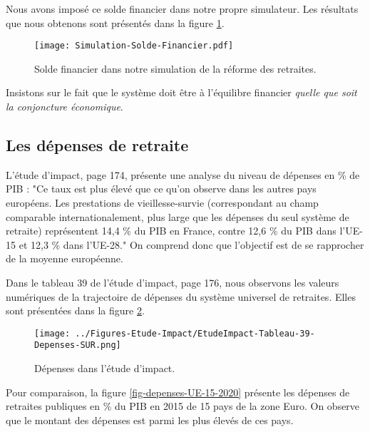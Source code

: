\documentclass[10pt]{article}
\begin{document}
Nous avons imposé ce solde financier dans notre propre simulateur. 
Les résultats que nous obtenons sont présentés dans la figure \ref{fig-solde-simulation}. 

\begin{figure}
\begin{center}
\texttt{[image: Simulation-Solde-Financier.pdf]}
\end{center}
\caption{Solde financier dans notre simulation de la réforme des retraites.}
\label{fig-solde-simulation}
\end{figure}

Insistons sur le fait que le système doit être à 
l'équilibre financier \emph{quelle que soit la 
conjoncture économique}. 


\subsection{Les dépenses de retraite}

L'étude d'impact, page 174, présente une analyse du niveau de dépenses 
en \% de PIB : "Ce taux est plus élevé que ce qu’on observe dans 
les autres pays européens. Les prestations de vieillesse-survie 
(correspondant au champ comparable internationalement, plus 
large que les dépenses du seul système de retraite) représentent 
14,4 \% du PIB en France, contre 12,6 \% du PIB dans l’UE-15 et 12,3 \% dans l’UE-28."
On comprend donc que l'objectif est de se rapprocher de la moyenne européenne. 

Dans le tableau 39 de l'étude d'impact, page 176, nous observons les valeurs numériques de la trajectoire de dépenses du système universel de retraites. 
Elles sont présentées dans la figure \ref{fig-depenses-etude-impact}.

\begin{figure}
\begin{center}
\texttt{[image: ../Figures-Etude-Impact/EtudeImpact-Tableau-39-Depenses-SUR.png]}
\end{center}
\caption{Dépenses dans l'étude d'impact.}
\label{fig-depenses-etude-impact}
\end{figure}

Pour comparaison, la figure \ref{fig-depenses-UE-15-2020} présente les dépenses de retraites 
publiques en \% du PIB en 2015 de 15 pays de la zone Euro.  
On observe que le montant des dépenses est parmi les plus élevés de ces pays. 
\end{document}
